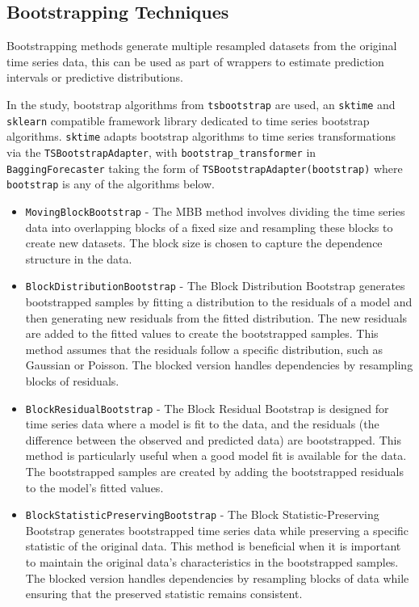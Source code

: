 \subsection{Bootstrapping Techniques}

Bootstrapping methods generate multiple resampled datasets from the original time series data, this can be used as part of wrappers to estimate prediction intervals or predictive distributions.

In the study, bootstrap algorithms from \texttt{tsbootstrap} are used, an \texttt{sktime} and \texttt{sklearn} compatible framework library dedicated to time series bootstrap algorithms. \texttt{sktime} adapts bootstrap algorithms to time series transformations via the \texttt{TSBootstrapAdapter}, with \texttt{bootstrap\_transformer} in \texttt{BaggingForecaster} taking the form of \texttt{TSBootstrapAdapter(bootstrap)} where \texttt{bootstrap} is any of the algorithms below.

\begin{itemize}
    
    \item \texttt{MovingBlockBootstrap} -
    The MBB method involves dividing the time series data into overlapping blocks of a fixed size and resampling these blocks to create new datasets. The block size is chosen to capture the dependence structure in the data. 

    \item \texttt{BlockDistributionBootstrap} -
    The Block Distribution Bootstrap generates bootstrapped samples by fitting a distribution to the residuals of a model and then generating new residuals from the fitted distribution. The new residuals are added to the fitted values to create the bootstrapped samples. This method assumes that the residuals follow a specific distribution, such as Gaussian or Poisson. The blocked version handles dependencies by resampling blocks of residuals.

    \item \texttt{BlockResidualBootstrap} -
    The Block Residual Bootstrap is designed for time series data where a model is fit to the data, and the residuals (the difference between the observed and predicted data) are bootstrapped. This method is particularly useful when a good model fit is available for the data. The bootstrapped samples are created by adding the bootstrapped residuals to the model's fitted values.

    \item \texttt{BlockStatisticPreservingBootstrap} -
    The Block Statistic-Preserving Bootstrap generates bootstrapped time series data while preserving a specific statistic of the original data. This method is beneficial when it is important to maintain the original data's characteristics in the bootstrapped samples. The blocked version handles dependencies by resampling blocks of data while ensuring that the preserved statistic remains consistent.

\end{itemize}

